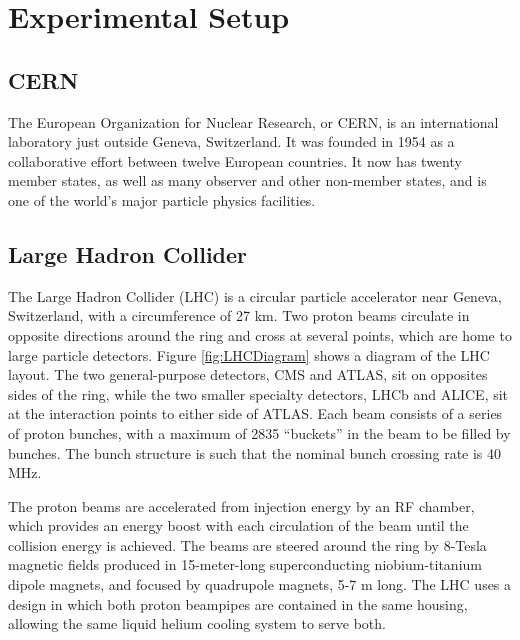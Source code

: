 \chapter{Experimental Setup}
\section{CERN}
The European Organization for Nuclear Research, or CERN, is an
international laboratory just outside Geneva, Switzerland.  
It was founded in 1954 as a collaborative effort between twelve European 
countries.  
It now has twenty member states, as well as many observer 
and other non-member states, and is one of the world's major 
particle physics facilities.  

\section{Large Hadron Collider}



The Large Hadron Collider (LHC) is a circular particle accelerator near Geneva, Switzerland, 
with a circumference of 27 km. 
Two proton beams circulate in opposite directions around the ring
and cross at several points, which are home to large particle detectors.  
Figure \ref{fig:LHCDiagram} shows a diagram of the LHC layout.  
The two general-purpose detectors, CMS and ATLAS, sit on opposites sides of the ring, 
while the two smaller specialty detectors, LHCb and ALICE, 
sit at the interaction points to either side of ATLAS.  
Each beam consists of a series of proton bunches, 
with a maximum of 2835 ``buckets'' in the beam to be filled by bunches.  
The bunch structure is such that the nominal bunch crossing rate is 40 MHz.  

The proton beams are accelerated from injection energy by an RF chamber, 
which provides an energy boost with each circulation of the beam
until the collision energy is achieved.  
The beams are steered around the ring by 8-Tesla magnetic fields produced in 
15-meter-long superconducting niobium-titanium dipole magnets,
and focused by quadrupole magnets, 5-7 m long.  
The LHC uses a design in which both proton beampipes are contained in the same housing,
allowing the same liquid helium cooling system to serve both.  

